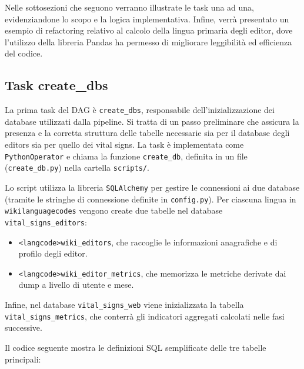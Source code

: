 Nelle sottosezioni che seguono verranno illustrate le task una ad una, evidenziandone lo scopo e la logica implementativa.
Infine, verrà presentato un esempio di refactoring relativo al calcolo della lingua primaria degli editor, dove l’utilizzo della libreria Pandas ha permesso di migliorare leggibilità ed efficienza del codice.
\subsection{Task create\_dbs}
\label{subsec:create_dbs}

La prima task del DAG è \texttt{create\_dbs}, responsabile dell’inizializzazione dei database utilizzati dalla pipeline. 
Si tratta di un passo preliminare che assicura la presenza e la corretta struttura delle tabelle necessarie sia per il database degli editors sia per quello dei vital signs. 
La task è implementata come \texttt{PythonOperator} e chiama la funzione \texttt{create\_db}, definita in un file (\texttt{create\_db.py}) nella cartella \texttt{scripts/}.

Lo script utilizza la libreria \texttt{SQLAlchemy} per gestire le connessioni ai due database (tramite le stringhe di connessione definite in \texttt{config.py}). 
Per ciascuna lingua in \texttt{wikilanguagecodes} vengono create due tabelle nel database \texttt{vital\_signs\_editors}:

\begin{itemize}
    \item \texttt{<langcode>wiki\_editors}, che raccoglie le informazioni anagrafiche e di profilo degli editor.
    \item \texttt{<langcode>wiki\_editor\_metrics}, che memorizza le metriche derivate dai dump a livello di utente e mese.
\end{itemize}

Infine, nel database \texttt{vital\_signs\_web} viene inizializzata la tabella \texttt{vital\_signs\_metrics}, che conterrà gli indicatori aggregati calcolati nelle fasi successive. 

Il codice seguente mostra le definizioni SQL semplificate delle tre tabelle principali:



